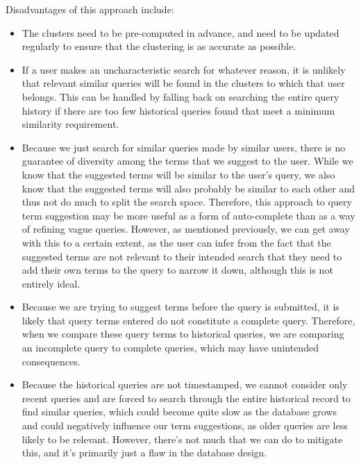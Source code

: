 \documentclass[a4paper]{article}
\begin{document}
Disadvantages of this approach include:
\begin{itemize}
    \item   The clusters need to be pre-computed in advance, and need to be updated regularly to ensure that the clustering is as accurate as possible.

    \item   If a user makes an uncharacteristic search for whatever reason, it is unlikely that relevant similar queries will be found in the clusters to which that user belongs.
            This can be handled by falling back on searching the entire query history if there are too few historical queries found that meet a minimum similarity requirement.

    \item   Because we just search for similar queries made by similar users, there is no guarantee of diversity among the terms that we suggest to the user.
            While we know that the suggested terms will be similar to the user's query, we also know that the suggested terms will also probably be similar to each other and thus not do much to split the search space.
            Therefore, this approach to query term suggestion may be more useful as a form of auto-complete than as a way of refining vague queries.
            However, as mentioned previously, we can get away with this to a certain extent, as the user can infer from the fact that the suggested terms are not relevant to their intended search that they need to add their own terms to the query to narrow it down, although this is not entirely ideal.

    \item   Because we are trying to suggest terms before the query is submitted, it is likely that query terms entered do not constitute a complete query.
            Therefore, when we compare these query terms to historical queries, we are comparing an incomplete query to complete queries, which may have unintended consequences.

    \item   Because the historical queries are not timestamped, we cannot consider only recent queries and are forced to search through the entire historical record to find similar queries, which could become quite slow as the database grows and could negatively influence our term suggestions, as older queries are less likely to be relevant.
            However, there's not much that we can do to mitigate this, and it's primarily just a flaw in the database design.


\end{itemize}
\end{document}
